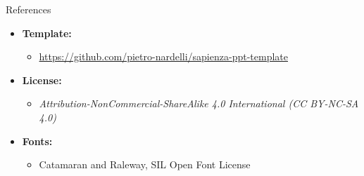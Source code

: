 \documentclass[t,aspectratio=169]{beamer}
\begin{document}
\begin{frame}{References}
  \begin{itemize}
    \item \textbf{Template:}
      \begin{itemize}\item \url{https://github.com/pietro-nardelli/sapienza-ppt-template}\end{itemize}
    \item \textbf{License:}
      \begin{itemize}\item {\itshape Attribution-NonCommercial-ShareAlike 4.0 International (CC BY-NC-SA 4.0)}\end{itemize}
    \item \textbf{Fonts:}
      \begin{itemize}\item Catamaran and Raleway, SIL Open Font License\end{itemize}
  \end{itemize}
\end{frame}

\begin{frame}[plain]
\end{frame}
\end{document}
